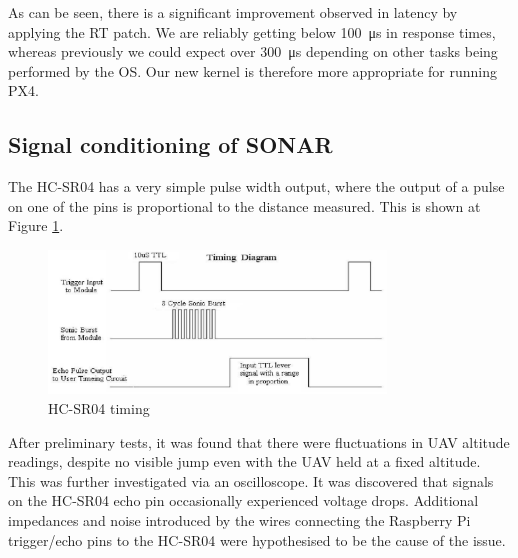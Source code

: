 \documentclass[capstone_report.tex]{subfiles}
\begin{document}
    As can be seen, there is a significant improvement observed in latency by applying the RT patch. We are reliably getting below \SI{100}{\micro\second} in response times, whereas previously we could expect over \SI{300}{\micro\second} depending on other tasks being performed by the OS. Our new kernel is therefore more appropriate for running PX4.

    \subsection{Signal conditioning of SONAR}
 	The HC-SR04 has a very simple pulse width output, where the output of a pulse on one of the pins is proportional to the distance measured. This is shown at Figure \ref{fig:sr04}.

    \begin{figure}[H]
        \centering
        \includegraphics[width=0.8\textwidth]{imgs/sr04.png}
        \caption{HC-SR04 timing\label{fig:sr04}}
    \end{figure}

After preliminary tests, it was found that there were fluctuations in UAV altitude readings, despite no visible jump even with the UAV held at a fixed altitude. This was further investigated via an oscilloscope. It was discovered that signals on the HC-SR04 echo pin occasionally experienced voltage drops. Additional impedances and noise introduced by the wires connecting the Raspberry Pi trigger/echo pins to the HC-SR04 were hypothesised to be the cause of the issue. \\
\end{document}
